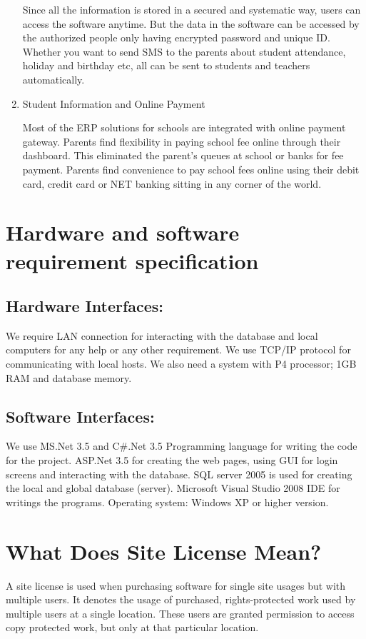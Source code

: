 \documentclass[a4paper]{article}
\begin{document}
\begin{enumerate}
    Since all the information is stored in a secured and systematic way,
    users can access the software anytime. But the data in the software
    can be accessed by the authorized people only having encrypted password
    and unique ID. Whether you want to send SMS to the parents about
    student attendance, holiday and birthday etc, all can be sent to
    students and teachers automatically.

  \item Student Information and Online Payment

    Most of the ERP solutions for schools are integrated with online
    payment gateway. Parents find flexibility in paying school fee online
    through their dashboard. This eliminated the parent’s queues at school
    or banks for fee payment. Parents find convenience to pay school fees
    online using their debit card, credit card or NET banking sitting in
    any corner of the world.
\end{enumerate}

\section{Hardware and software requirement specification}
\subsection{Hardware Interfaces:}
We require LAN connection for interacting with the database and local computers for
any help or any other requirement. We use TCP/IP protocol for communicating with
local hosts. We also need a system with P4 processor; 1GB RAM and database memory.

\subsection{Software Interfaces:}
We use MS.Net 3.5 and C\#.Net 3.5 Programming language for writing the code for the
project. ASP.Net 3.5 for creating the web pages, using GUI for login screens and
interacting with the database. SQL server 2005 is used for creating the local and
global database (server). Microsoft Visual Studio 2008 IDE for writings the programs.
Operating system: Windows XP or higher version.

\section{What Does Site License Mean?}
A site license is used when purchasing software for single site usages but with multiple users. It
denotes the usage of purchased, rights-protected work used by multiple users at a single location. These
users are granted permission to access copy protected work, but only at that particular location.
\end{document}
